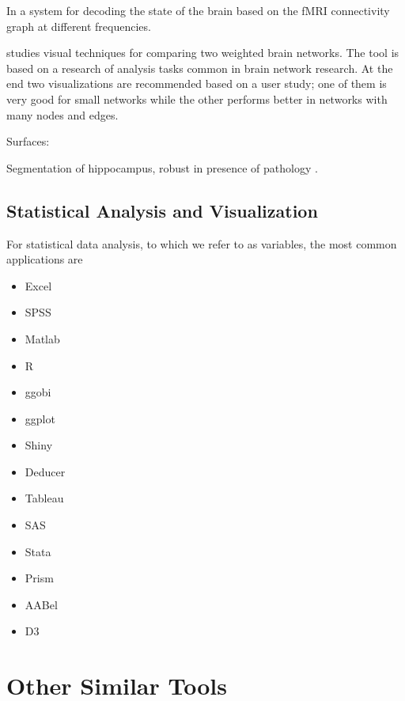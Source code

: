 In \autocite{richiardi_decoding_2011} a system for decoding the state of the brain based on the fMRI connectivity graph at different frequencies.

\autocite{alper_weighted_2013} studies visual techniques for comparing two weighted brain networks. The tool is based on a research of analysis tasks common in brain network research. At the end two visualizations are recommended based on a user study; one of them is very good for small networks while the other performs better in networks with many nodes and edges.

Surfaces:



\begin{table}
	\centering
		\begin{tabular}
			
		\end{tabular}
	\label{tab_related_applications}
\end{table}


Segmentation of hippocampus, robust in presence of pathology \autocite{kim_robust_2011}.


\subsection{Statistical Analysis and Visualization}
For statistical data analysis, to which we refer to as variables, the most common applications are
\begin{itemize}
	\item Excel
	\item SPSS
	\item Matlab
	\item R
	\item ggobi
	\item ggplot
	\item Shiny
	\item Deducer
	\item Tableau
	\item SAS
	\item Stata
	\item Prism
	\item AABel
	\item D3
\end{itemize}


\section{Other Similar Tools}

